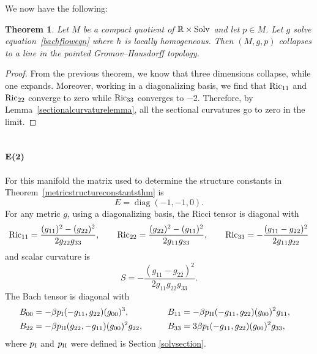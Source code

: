 \documentclass[10pt,a4paper]{amsart}
\numberwithin{equation}{section}
\newtheorem{Theorem}{Theorem}[section]
\newcommand{\diag}{\operatorname{diag}} %
\begin{document}
We now have the following:

\begin{Theorem}Let $M$ be a compact quotient of $\mathbb{R} \times {\rm Solv}$ and let $p \in M$. Let $g$ solve equa\-tion~\eqref{bachfloweqn} where $h$ is locally homogeneous. Then $(M, g, p)$ collapses to a line in the pointed Gromov--Hausdorff topology.
\end{Theorem}

\begin{proof}From the previous theorem, we know that three dimensions collapse, while one expands. Moreover, working in a diagonalizing basis, we find that ${\rm Ric}_{11}$ and ${\rm Ric}_{22}$ converge to zero while ${\rm Ric}_{33}$ converges to $-2$. Therefore, by Lemma~\ref{sectionalcurvaturelemma}, all the sectional curvatures go to zero in the limit.
\end{proof}

\subsection[${\rm E}(2)$]{$\boldsymbol{{\rm E}(2)}$}

For this manifold the matrix used to determine the structure constants in Theorem~\ref{metricstructureconstantsthm} is
\[
E = \diag(-1, -1, 0).
\]
For any metric $g$, using a diagonalizing basis, the Ricci tensor is diagonal with
\begin{gather*}
{\rm Ric}_{11} = \frac{(g_{11})^2 - (g_{22})^2}{2 g_{22} g_{33}},\qquad
{\rm Ric}_{22} = \frac{(g_{22})^2 - (g_{11})^2}{2 g_{11} g_{33}},\qquad
{\rm Ric}_{33} = - \frac{(g_{11} - g_{22})^2}{2 g_{11} g_{22}}
\end{gather*}
and scalar curvature is
\[
S = -\frac{(g_{11} - g_{22})^2}{2 g_{11} g_{22} g_{33}}.
\]
The Bach tensor is diagonal with
\begin{alignat*}{3}
& B_{00}= -\beta p_{\rm I}(-g_{11}, g_{22}) (g_{00})^3,\qquad &&
B_{11}= -\beta p_{\rm II}(-g_{11}, g_{22}) (g_{00})^2 g_{11}, &\\
& B_{22}= -\beta p_{\rm II}(g_{22}, -g_{11}) (g_{00})^2 g_{22}, \qquad &&
B_{33}= 3\beta p_{\rm I}(-g_{11}, g_{22}) (g_{00})^2 g_{33},&
\end{alignat*}
where $p_{\rm I}$ and $p_{\rm II}$ were defined is Section \ref{solvsection}.
\end{document}
